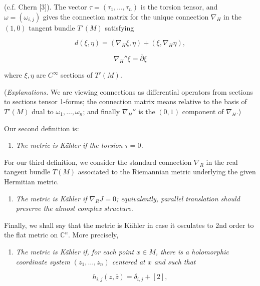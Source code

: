 \documentclass[
  english,
  a3paper,
  a3paper]{extarticle}
\providecommand{\tightlist}{%
  \setlength{\itemsep}{0pt}\setlength{\parskip}{0pt}}
\begin{document}
\fontsize{9}{11}\selectfont

(c.f. Chern {[}3{]}). The vector \(\tau=(\tau_1,\ldots,\tau_n)\) is the
torsion tensor, and \(\omega=(\omega_{i,j})\) gives the connection
matrix for the unique connection \(\nabla_H\) in the \((1,0)\) tangent
bundle \(T'(M)\) satisfying

\[d(\xi,\eta)=(\nabla_H\xi,\eta)+(\xi,\nabla_H\eta),\]

\[\nabla_H''\xi=\bar\partial\xi\]

where \(\xi,\eta\) are \(C^\infty\) sections of \(T'(M)\).

(\emph{Explanations.} We are viewing connections as differential
operators from sections to sections tensor 1-forms; the connection
matrix means relative to the basis of \(T'(M)\) dual to
\(\omega_1,\ldots,\omega_n\); and finally \(\nabla_H''\) is the
\((0,1)\) component of \(\nabla_H\).)

Our second definition is:

\begin{enumerate}
\def\labelenumi{(\roman{enumi})}
\setcounter{enumi}{1}
\tightlist
\item
  \emph{The metric is Kähler if the torsion \(\tau=0\).}
\end{enumerate}

For our third definition, we consider the standard connection
\(\nabla_R\) in the real tangent bundle \(T(M)\) associated to the
Riemannian metric underlying the given Hermitian metric.

\begin{enumerate}
\def\labelenumi{(\roman{enumi})}
\setcounter{enumi}{2}
\tightlist
\item
  \emph{The metric is Kähler if \(\nabla_RJ=0\); equivalently, parallel
  translation should preserve the almost complex structure.}
\end{enumerate}

Finally, we shall say that the metric is Kähler in case it osculates to
2nd order to the flat metric on \(\mathbb C^n\). More precisely,

\begin{enumerate}
\def\labelenumi{(\roman{enumi})}
\setcounter{enumi}{3}
\tightlist
\item
  \emph{The metric is Kähler if, for each point \(x\in M\), there is a
  holomorphic coordinate system \((z_1,\ldots,z_n)\) centered at \(x\)
  and such that}
\end{enumerate}

\[\tag{5.3}h_{i,j}(z,\bar z)=\delta_{i,j}+[2],\]
\end{document}

